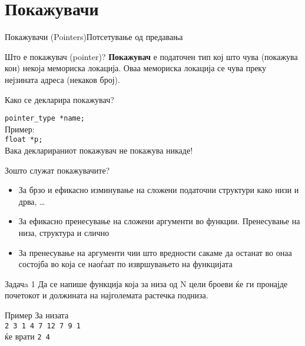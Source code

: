\section{Покажувачи}

\begin{frame}[fragile,shrink=10]{Покажувачи (Pointers)}{Потсетување од
предавања}
  \begin{block}{Што е покажувач (pointer)?}
    \textbf{Покажувач} е \alert{податочен тип} кој што чува (покажува кон)
    некоја мемориска локација. Оваа мемориска локација се чува преку нејзината адреса (некаков
    број).
  \end{block}
  \begin{block}{Како се декларира покажувач?}
  
    \texttt{pointer\_type *name;}\\
    Пример:\\
    \texttt{float *p;}\\
    \alert{Вака декларираниот покажувач не покажува никаде!}
  \end{block}
  \begin{block}{Зошто служат покажувачите?}
    \begin{itemize}
      \item За брзо и ефикасно изминување на сложени податочни структури како
      низи и дрва, \ldots
      \item За ефикасно пренесување на сложени аргументи во функции. Пренесување
      на низа, структура и слично
      \item За пренесување на аргументи чии што вредности сакаме да останат во
      онаа состојба во која се наоѓаат по извршувањето на функцијата
    \end{itemize}
  \end{block}
  
\end{frame}

\begin{frame}{Задачa 1}
Да се напише функција која за низа од N цели броеви ќе ги пронајде почетокот и
должината на најголемата растечка подниза.
\begin{exampleblock}{Пример}
За низата\\
\texttt{2 3 {\color{red}1 4 7 12} 7 9 1}\\
ќе врати \texttt{2 4}
\end{exampleblock}
\end{frame}

